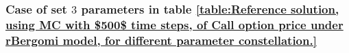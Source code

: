 \FloatBarrier
\subsubsection{Case of set $3$ parameters in table \ref{table:Reference solution, using MC with $500$ time steps, of Call option price under rBergomi model, for different parameter constellation.}}\label{sec:Case of set 4 parameters}
%		
%		
%		
\FloatBarrier

